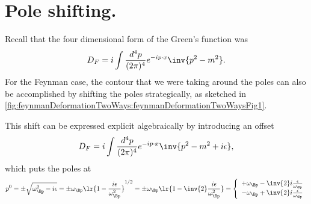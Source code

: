 %
%
\section{Pole shifting.}

Recall that the four dimensional form of the Green's function was
\begin{dmath}\label{eqn:qftLecture13:400}
D_F = i \int \frac{d^4 p}{(2 \pi)^4} e^{-i p \cdot x} \inv{ p^2 - m^2 }.
\end{dmath}
For the Feynman case, the contour that we were taking around the poles can also be accomplished by shifting the poles strategically, as sketched in \cref{fig:feynmanDeformationTwoWays:feynmanDeformationTwoWaysFig1}.


This shift can be expressed explicit algebraically by introducing an offset
\begin{dmath}\label{eqn:qftLecture13:420}
D_F = i \int \frac{d^4 p}{(2 \pi)^4} e^{-i p \cdot x} \inv{ p^2 - m^2 + i \epsilon },
\end{dmath}
which puts the poles at
\begin{dmath}\label{eqn:qftLecture13:440}
p^0
= \pm \sqrt{ \omega_\Bp^2 - i \epsilon }
= \pm \omega_\Bp \lr{ 1 - \frac{i \epsilon}{\omega_\Bp^2} }^{1/2}
= \pm \omega_\Bp \lr{ 1 - \inv{2} \frac{i \epsilon}{\omega_\Bp^2} }
=
\left\{
\begin{array}{l}
+\omega_\Bp - \inv{2} i \frac{\epsilon}{\omega_\Bp} \\
-\omega_\Bp + \inv{2} i \frac{\epsilon}{\omega_\Bp} \\
\end{array}
\right.
\end{dmath}

